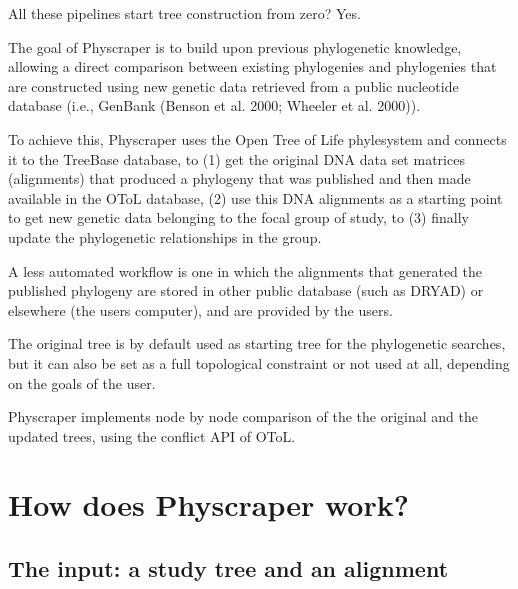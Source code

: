 \documentclass[draft]{ametsoc}
\begin{document}
All these pipelines start tree construction from zero? Yes.

The goal of Physcraper is to build upon previous phylogenetic knowledge,
allowing a direct comparison between existing phylogenies and
phylogenies that are constructed using new genetic data retrieved from a
public nucleotide database (i.e., GenBank (Benson et al. 2000; Wheeler
et al. 2000)).

To achieve this, Physcraper uses the Open Tree of Life phylesystem and
connects it to the TreeBase database, to (1) get the original DNA data
set matrices (alignments) that produced a phylogeny that was published
and then made available in the OToL database, (2) use this DNA
alignments as a starting point to get new genetic data belonging to the
focal group of study, to (3) finally update the phylogenetic
relationships in the group.

A less automated workflow is one in which the alignments that generated
the published phylogeny are stored in other public database (such as
DRYAD) or elsewhere (the users computer), and are provided by the users.

The original tree is by default used as starting tree for the
phylogenetic searches, but it can also be set as a full topological
constraint or not used at all, depending on the goals of the user.

Physcraper implements node by node comparison of the the original and
the updated trees, using the conflict API of OToL.

\hypertarget{how-does-physcraper-work}{%
\section{How does Physcraper work?}\label{how-does-physcraper-work}}

\hypertarget{the-input-a-study-tree-and-an-alignment}{%
\subsection{The input: a study tree and an
alignment}\label{the-input-a-study-tree-and-an-alignment}}
\end{document}
